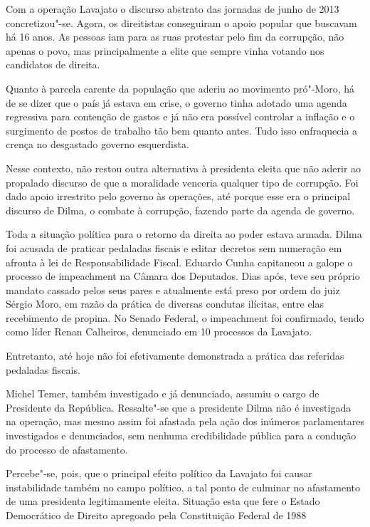 Com a operação Lavajato o discurso abstrato das jornadas de junho de
2013 concretizou"-se. Agora, os direitistas conseguiram o apoio popular
que buscavam há 16 anos. As pessoas iam para as ruas protestar pelo fim
da corrupção, não apenas o povo, mas principalmente a elite que sempre
vinha votando nos candidatos de direita.

Quanto à parcela carente da população que aderiu ao movimento pró"-Moro,
há de se dizer que o país já estava em crise, o governo tinha adotado
uma agenda regressiva para contenção de gastos e já não era possível
controlar a inflação e o surgimento de postos de trabalho tão bem quanto antes. Tudo isso enfraquecia a crença no desgastado governo esquerdista.

Nesse contexto, não restou outra alternativa à presidenta eleita que não
aderir ao propalado discurso de que a moralidade venceria qualquer tipo
de corrupção. Foi dado apoio irrestrito pelo governo às operações, até
porque esse era o principal discurso de Dilma, o combate à corrupção,
fazendo parte da agenda de governo.

Toda a situação política para o retorno da direita ao poder estava
armada. Dilma foi acusada de praticar pedaladas fiscais e editar
decretos sem numeração em afronta à lei de Responsabilidade Fiscal.
Eduardo Cunha capitaneou a galope o processo de impeachment na Câmara
dos Deputados. Dias após, teve seu próprio mandato cassado pelos seus
pares e atualmente está preso por ordem do juiz Sérgio Moro, em razão da
prática de diversas condutas ilícitas, entre elas recebimento de
propina. No Senado Federal, o impeachment foi confirmado, tendo como
líder Renan Calheiros, denunciado em 10 processos da Lavajato.

Entretanto, até hoje não foi efetivamente demonstrada a prática das
referidas pedaladas fiscais.

Michel Temer, também investigado e já denunciado, assumiu o cargo de
Presidente da República. Ressalte"-se que a presidente Dilma não é
investigada na operação, mas mesmo assim foi afastada pela ação dos
inúmeros parlamentares investigados e denunciados, sem nenhuma
credibilidade pública para a condução do processo de afastamento.

Percebe"-se, pois, que o principal efeito político da Lavajato foi causar
instabilidade também no campo político, a tal ponto de culminar no
afastamento de uma presidenta legitimamente eleita. Situação esta que
fere o Estado Democrático de Direito apregoado pela Constituição Federal
de 1988


